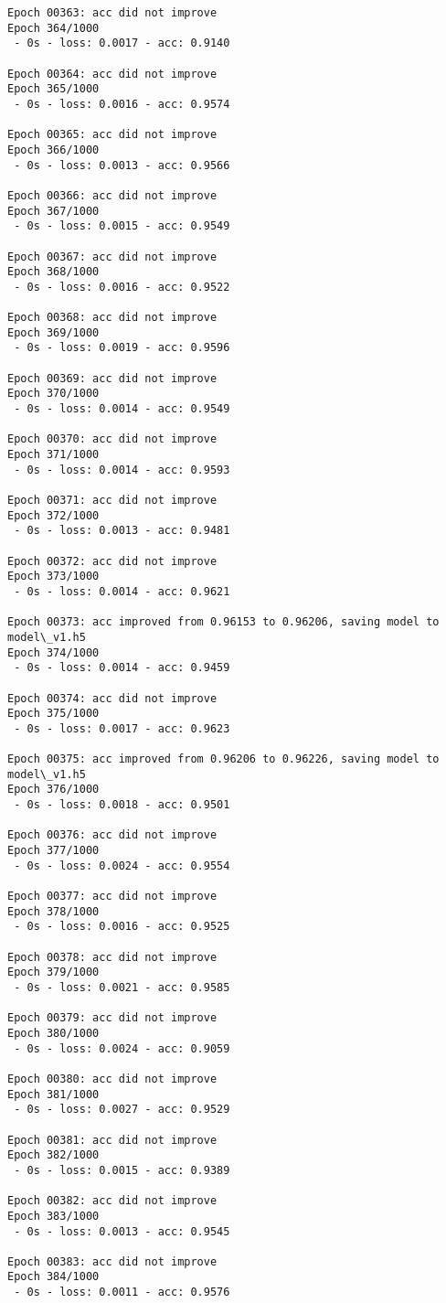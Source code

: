 \documentclass[11pt]{article}
\begin{document}
\begin{Verbatim}[commandchars=\\\{\}]
Epoch 00363: acc did not improve
Epoch 364/1000
 - 0s - loss: 0.0017 - acc: 0.9140

Epoch 00364: acc did not improve
Epoch 365/1000
 - 0s - loss: 0.0016 - acc: 0.9574

Epoch 00365: acc did not improve
Epoch 366/1000
 - 0s - loss: 0.0013 - acc: 0.9566

Epoch 00366: acc did not improve
Epoch 367/1000
 - 0s - loss: 0.0015 - acc: 0.9549

Epoch 00367: acc did not improve
Epoch 368/1000
 - 0s - loss: 0.0016 - acc: 0.9522

Epoch 00368: acc did not improve
Epoch 369/1000
 - 0s - loss: 0.0019 - acc: 0.9596

Epoch 00369: acc did not improve
Epoch 370/1000
 - 0s - loss: 0.0014 - acc: 0.9549

Epoch 00370: acc did not improve
Epoch 371/1000
 - 0s - loss: 0.0014 - acc: 0.9593

Epoch 00371: acc did not improve
Epoch 372/1000
 - 0s - loss: 0.0013 - acc: 0.9481

Epoch 00372: acc did not improve
Epoch 373/1000
 - 0s - loss: 0.0014 - acc: 0.9621

Epoch 00373: acc improved from 0.96153 to 0.96206, saving model to model\_v1.h5
Epoch 374/1000
 - 0s - loss: 0.0014 - acc: 0.9459

Epoch 00374: acc did not improve
Epoch 375/1000
 - 0s - loss: 0.0017 - acc: 0.9623

Epoch 00375: acc improved from 0.96206 to 0.96226, saving model to model\_v1.h5
Epoch 376/1000
 - 0s - loss: 0.0018 - acc: 0.9501

Epoch 00376: acc did not improve
Epoch 377/1000
 - 0s - loss: 0.0024 - acc: 0.9554

Epoch 00377: acc did not improve
Epoch 378/1000
 - 0s - loss: 0.0016 - acc: 0.9525

Epoch 00378: acc did not improve
Epoch 379/1000
 - 0s - loss: 0.0021 - acc: 0.9585

Epoch 00379: acc did not improve
Epoch 380/1000
 - 0s - loss: 0.0024 - acc: 0.9059

Epoch 00380: acc did not improve
Epoch 381/1000
 - 0s - loss: 0.0027 - acc: 0.9529

Epoch 00381: acc did not improve
Epoch 382/1000
 - 0s - loss: 0.0015 - acc: 0.9389

Epoch 00382: acc did not improve
Epoch 383/1000
 - 0s - loss: 0.0013 - acc: 0.9545

Epoch 00383: acc did not improve
Epoch 384/1000
 - 0s - loss: 0.0011 - acc: 0.9576


\end{Verbatim}
\end{document}
